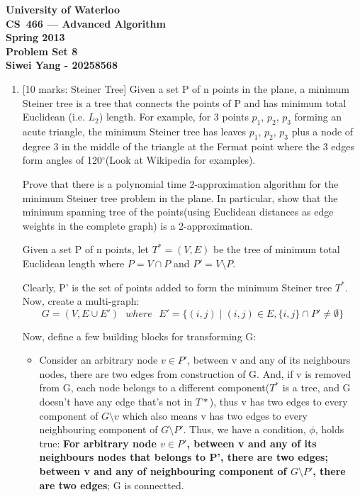 \documentclass[12pt]{article}
\begin{document}
\begin{center}
\large\bf University of Waterloo\\
CS~466 --- Advanced Algorithm\\
Spring 2013\\
Problem Set 8\\
Siwei Yang - 20258568\\
\end{center}
\bigskip

\begin{enumerate}

\item{} [10 marks: Steiner Tree]
Given a set P of n points in the plane, a minimum Steiner tree is a tree that connects the points of P and has minimum total Euclidean (i.e. $L_{2}$) length. For example, for 3 points $p_{1}$, $p_{2}$, $p_{3}$ forming an acute triangle, the minimum Steiner tree has leaves $p_{1}$, $p_{2}$, $p_{3}$ plus a node of degree 3 in the middle of the triangle at the Fermat point where the 3 edges form angles of 120$^\circ$(Look at Wikipedia for examples).

Prove that there is a polynomial time 2-approximation algorithm for the minimum Steiner tree problem in the plane. In particular, show that the minimum spanning tree of the points(using Euclidean distances as edge weights in the complete graph) is a 2-approximation.

Given a set P of n points, let $T^{*} = (V, E)$ be the tree of minimum total Euclidean length where $P = V \cap P$ and $P' = V \setminus P$.

Clearly, P' is the set of points added to form the minimum Steiner tree $T^{*}$. Now, create a multi-graph:
\begin{equation}
G = (V, E \cup E') \text{ } where \text{ } E' = \{ (i, j) \mid (i, j) \in E, \{i, j\} \cap P' \neq \emptyset \}
\end{equation}

Now, define a few building blocks for transforming G:
\begin{itemize}
\item{} Consider an arbitrary node $v \in P'$, between v and any of its neighbours nodes, there are two edges from construction of G. And, if v is removed from G, each node belongs to a different component($T^{*}$ is a tree, and G doesn't have any edge that's not in $T{*}$), thus v has two edges to every component of $G \setminus v$ which also means v has two edges to every neighbouring component of $G \setminus P'$. Thus, we have a condition, $\phi$, holds true: \textbf{For arbitrary node $v \in P'$, between v and any of its neighbours nodes that belongs to P', there are two edges; between v and any of neighbouring component of $G \setminus P'$, there are two edges}; G is connectted.


\end{itemize}
\end{enumerate}
\end{document}
